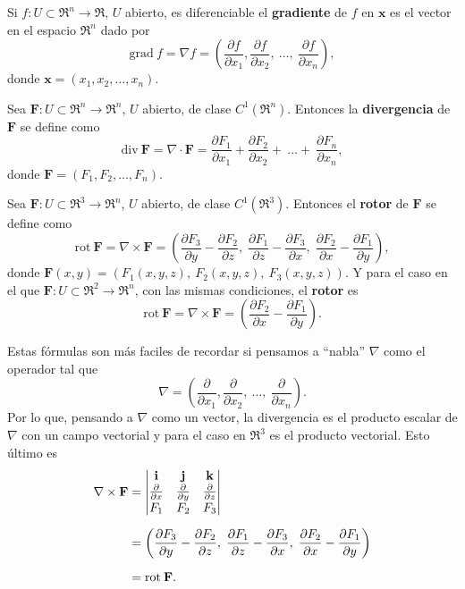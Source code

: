 \begin{definition}
    Si $f:U\subset\Re^n\to\Re$, $U$ abierto, es diferenciable el \textbf{gradiente} de $f$ en $\mathbf{x}$ es el vector en el espacio $\Re^n$ dado por 
    \[
        \text{grad}\:f=\nabla f=(\frac{\partial f}{\partial x_1},\frac{\partial f}{\partial x_2},\:\ldots,\: \frac{\partial f}{\partial x_n}),
    \]
    donde $\mathbf{x}=(x_1, x_2,\ldots, x_n)$.
\end{definition}
\begin{definition}
    Sea $\mathbf{F}:U\subset\Re^n\to\Re^n$, $U$ abierto, de clase $C^1(\Re^n)$. Entonces la \textbf{divergencia} de $\mathbf{F}$ se define como
    \[
        \text{div}\:\mathbf{F}=\nabla\cdot \mathbf{F}=  \frac{\partial F_1}{\partial x_1}+\frac{\partial F_2}{\partial x_2}+\:\ldots+\: \frac{\partial F_n}{\partial x_n},
    \]
    donde $\mathbf{F}=(F_1,F_2,\ldots,F_n)$.
\end{definition}
\begin{definition}
    Sea $\mathbf{F}:U\subset\Re^3\to\Re^n$, $U$ abierto, de clase $C^1(\Re^3)$. Entonces el \textbf{rotor} de $\mathbf{F}$ se define como 
    \[
        \text{rot}\:\mathbf{F}=\nabla\times\mathbf{F}=\left(\frac{\partial F_3}{\partial y}-\frac{\partial F_2}{\partial z},\;\frac{\partial F_1}{\partial z}-\frac{\partial F_3}{\partial x},\;\frac{\partial F_2}{\partial x}-\frac{\partial F_1}{\partial y}\right),
    \]   
    donde $\mathbf{F}(x,y)=(F_1(x,y,z),\:F_2(x,y,z),\:F_3(x,y,z))$.
    Y para el caso en el que $\mathbf{F}:U\subset\Re^2\to\Re^n$, con las mismas condiciones, el \textbf{rotor} es
    \[
        \text{rot}\:\mathbf{F}=\nabla\times\mathbf{F}=\left(\frac{\partial F_2}{\partial x}-\frac{\partial F_1}{\partial y}\right).
    \]
\end{definition}
    Estas f\'ormulas son m\'as faciles de recordar si pensamos a ``nabla'' $\nabla$ como el operador tal que 
    \[
        \nabla = (\frac{\partial}{\partial x_1},\frac{\partial}{\partial x_2},\:\ldots,\: \frac{\partial}{\partial x_n}).  
    \]
    Por lo que, pensando a $\nabla$ como un vector, la divergencia es el producto escalar de $\nabla$ con un campo vectorial y para el caso en $\Re^3$ es el producto vectorial. Esto \'ultimo es
    \begin{align*}
        \nabla\times\mathbf{F}&= 
        \begin{vmatrix}
        \mathbf{i} & \mathbf{j} & \mathbf{k} \\
        \frac{\partial}{\partial x} & \frac{\partial}{\partial y} & \frac{\partial}{\partial z} \\
        F_1 & F_2 & F_3
        \end{vmatrix} \\[.2cm]
        &=\left(\frac{\partial F_3}{\partial y}-\frac{\partial F_2}{\partial z},\;\frac{\partial F_1}{\partial z}-\frac{\partial F_3}{\partial x},\;\frac{\partial F_2}{\partial x}-\frac{\partial F_1}{\partial y}\right)\\[.2cm]
        &=\text{rot}\:\mathbf{F}.
    \end{align*}
